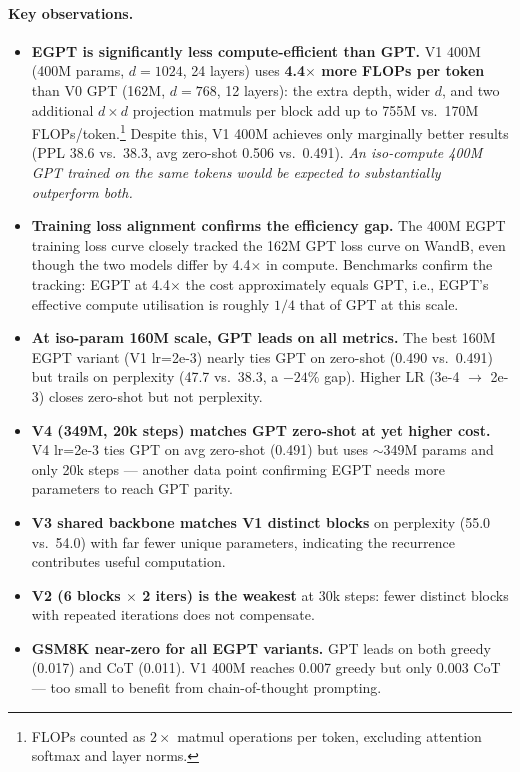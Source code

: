 \documentclass[11pt,a4paper]{article}
\begin{document}
\paragraph{Key observations.}
\begin{itemize}
  \item \textbf{EGPT is significantly less compute-efficient than GPT.}
    V1 400M (400M params, $d=1024$, 24 layers) uses \textbf{4.4$\times$ more FLOPs per
    token} than V0 GPT (162M, $d=768$, 12 layers): the extra depth, wider $d$, and two
    additional $d{\times}d$ projection matmuls per block add up to 755M vs.\ 170M
    FLOPs/token.\footnote{FLOPs counted as $2\times$ matmul operations per token, excluding
    attention softmax and layer norms.}
    Despite this, V1 400M achieves only marginally better results (PPL 38.6 vs.\ 38.3,
    avg zero-shot 0.506 vs.\ 0.491).
    \emph{An iso-compute 400M GPT trained on the same tokens would be expected to
    substantially outperform both.}
  \item \textbf{Training loss alignment confirms the efficiency gap.}
    The 400M EGPT training loss curve closely tracked the 162M GPT loss curve on WandB,
    even though the two models differ by 4.4$\times$ in compute.
    Benchmarks confirm the tracking: EGPT at 4.4$\times$ the cost approximately equals GPT,
    i.e., EGPT's effective compute utilisation is roughly $1/4$ that of GPT at this scale.
  \item \textbf{At iso-param 160M scale, GPT leads on all metrics.}
    The best 160M EGPT variant (V1 lr=2e-3) nearly ties GPT on zero-shot (0.490 vs.\ 0.491)
    but trails on perplexity (47.7 vs.\ 38.3, a $-24\%$ gap).
    Higher LR (3e-4 $\to$ 2e-3) closes zero-shot but not perplexity.
  \item \textbf{V4 (349M, 20k steps) matches GPT zero-shot at yet higher cost.}
    V4 lr=2e-3 ties GPT on avg zero-shot (0.491) but uses $\sim$349M params and only 20k
    steps --- another data point confirming EGPT needs more parameters to reach GPT parity.
  \item \textbf{V3 shared backbone matches V1 distinct blocks} on perplexity (55.0 vs.\ 54.0)
    with far fewer unique parameters, indicating the recurrence contributes useful computation.
  \item \textbf{V2 (6 blocks $\times$ 2 iters) is the weakest} at 30k steps: fewer distinct
    blocks with repeated iterations does not compensate.
  \item \textbf{GSM8K near-zero for all EGPT variants.}
    GPT leads on both greedy (0.017) and CoT (0.011).  V1 400M reaches 0.007 greedy but
    only 0.003 CoT --- too small to benefit from chain-of-thought prompting.
\end{itemize}
\end{document}
